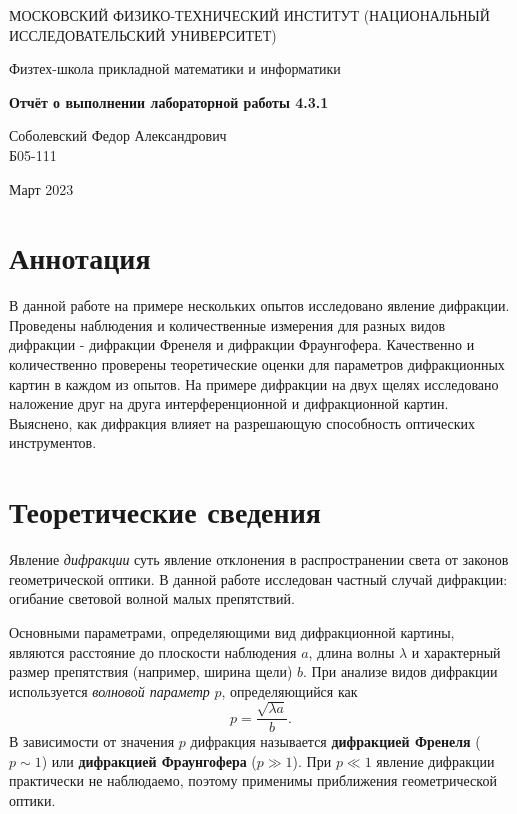 \documentclass[a4paper,12pt]{article} %
\date{\today}
\begin{document}
\begin{titlepage}
	\begin{center}
		{\large МОСКОВСКИЙ ФИЗИКО-ТЕХНИЧЕСКИЙ ИНСТИТУТ (НАЦИОНАЛЬНЫЙ ИССЛЕДОВАТЕЛЬСКИЙ УНИВЕРСИТЕТ)}
	\end{center}
	\begin{center}
		{\large Физтех-школа прикладной математики и информатики}
	\end{center}
	
	
	\vspace{4.5cm}
	{\huge
		\begin{center}
			{\bf Отчёт о выполнении лабораторной работы 4.3.1}\\
			
		\end{center}
	}
	\vspace{1cm}
	\begin{center}
		{\large Соболевский Федор Александрович \\
			\vspace{0.2cm}
			Б05-111}
	\end{center}
	\vspace{8cm}
	\begin{center}
		Март 2023
	\end{center}
\end{titlepage}

\section{Аннотация}
В данной работе на примере нескольких опытов исследовано явление дифракции. Проведены наблюдения и количественные измерения для разных видов дифракции - дифракции Френеля и дифракции Фраунгофера. Качественно и количественно проверены теоретические оценки для параметров дифракционных картин в каждом из опытов. На примере дифракции на двух щелях исследовано наложение друг на друга интерференционной и дифракционной картин. Выяснено, как дифракция влияет на разрешающую способность оптических инструментов.  

\section{Теоретические сведения}
Явление \textit{дифракции} суть явление отклонения в распространении света от законов геометрической оптики. В данной работе исследован частный случай дифракции: огибание световой волной малых препятствий.

Основными параметрами, определяющими вид дифракционной картины, являются расстояние до плоскости наблюдения $a$, длина волны $\lambda$ и характерный размер препятствия (например, ширина щели) $b$. При анализе видов дифракции используется \textit{волновой параметр} $p$, определяющийся как
\begin{equation} \label{waveParam}
    p = \frac{\sqrt{\lambda a}}{b}.
\end{equation}
В зависимости от значения $p$ дифракция называется \textbf{дифракцией Френеля} ($p \sim 1$) или \textbf{дифракцией Фраунгофера} ($p \gg 1$). При $p\ll 1$ явление дифракции практически не наблюдаемо, поэтому применимы приближения геометрической оптики.
\end{document}
